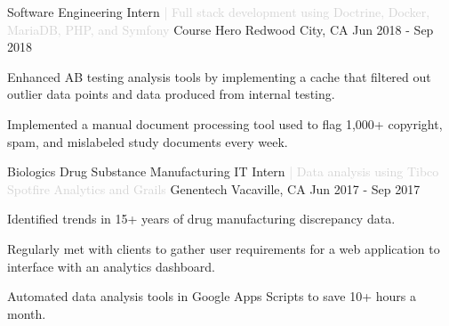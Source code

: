 

\begin{cventries}

  \cventry
  {Software Engineering Intern \textcolor{lightgray}{| Full stack development using Doctrine, Docker, MariaDB, PHP, and Symfony}}
  {Course Hero}
  {Redwood City, CA}
  {Jun 2018 - Sep 2018}
  {
  \begin{cvitems}
    \item {Enhanced AB testing analysis tools by implementing a cache that filtered out outlier data points and data produced from internal testing.}
    \item {Implemented a manual document processing tool used to flag 1,000+ copyright, spam, and mislabeled study documents every week.}
  \end{cvitems}
  }

  \cventry
  {Biologics Drug Substance Manufacturing IT Intern \textcolor{lightgray}{| Data analysis using Tibco Spotfire Analytics and Grails} } %
  {Genentech} %
  {Vacaville, CA} %
  {Jun 2017 - Sep 2017} %
  {
  \begin{cvitems} %
    \item {Identified trends in 15+ years of drug manufacturing discrepancy data.}
    \item {Regularly met with clients to gather user requirements for a web application to interface with an analytics dashboard.}
    \item {Automated data analysis tools in Google Apps Scripts to save 10+ hours a month.}
  \end{cvitems}
  }
\end{cventries}
